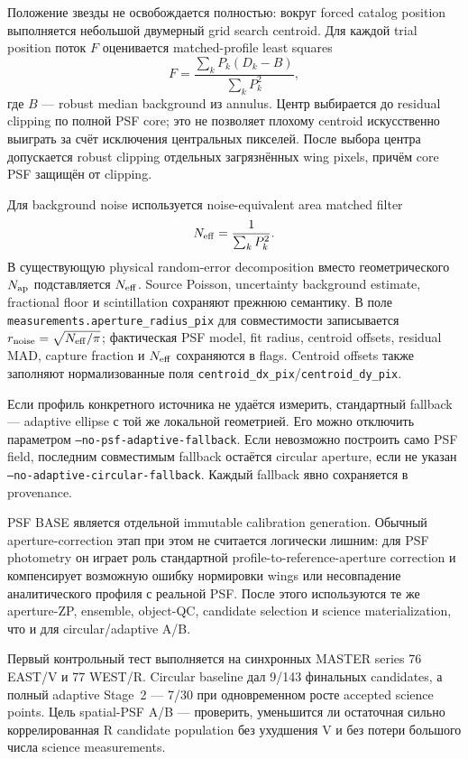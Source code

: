 Положение звезды не освобождается полностью: вокруг forced catalog position выполняется небольшой
двумерный grid search centroid. Для каждой trial position поток $F$ оценивается matched-profile
least squares
\begin{equation}
 F=\frac{\sum_k P_k(D_k-B)}{\sum_k P_k^2},
\end{equation}
где $B$ --- robust median background из annulus. Центр выбирается до residual clipping по полной
PSF core; это не позволяет плохому centroid искусственно выиграть за счёт исключения центральных
пикселей. После выбора центра допускается robust clipping отдельных загрязнённых wing pixels,
причём core PSF защищён от clipping.

Для background noise используется noise-equivalent area matched filter
\begin{equation}
 N_{\rm eff}=\frac{1}{\sum_k P_k^2}.
\end{equation}
В существующую physical random-error decomposition вместо геометрического $N_{\rm ap}$
подставляется $N_{\rm eff}$. Source Poisson, uncertainty background estimate, fractional floor и
scintillation сохраняют прежнюю семантику. В поле
\texttt{measurements.aperture\_radius\_pix} для совместимости записывается
$r_{\rm noise}=\sqrt{N_{\rm eff}/\pi}$; фактическая PSF model, fit radius, centroid offsets,
residual MAD, capture fraction и $N_{\rm eff}$ сохраняются в flags. Centroid offsets также
заполняют нормализованные поля \texttt{centroid\_dx\_pix}/\texttt{centroid\_dy\_pix}.

Если профиль конкретного источника не удаётся измерить, стандартный fallback ---
adaptive ellipse с той же локальной геометрией. Его можно отключить параметром
\texttt{--no-psf-adaptive-fallback}. Если невозможно построить само PSF field, последним
совместимым fallback остаётся circular aperture, если не указан
\texttt{--no-adaptive-circular-fallback}. Каждый fallback явно сохраняется в provenance.

PSF BASE является отдельной immutable calibration generation. Обычный aperture-correction этап
при этом не считается логически лишним: для PSF photometry он играет роль стандартной
profile-to-reference-aperture correction и компенсирует возможную ошибку нормировки wings или
несовпадение аналитического профиля с реальной PSF. После этого используются те же aperture-ZP,
ensemble, object-QC, candidate selection и science materialization, что и для circular/adaptive
A/B.

Первый контрольный тест выполняется на синхронных MASTER series 76 EAST/V и 77 WEST/R. Circular
baseline дал 9/143 финальных candidates, а полный adaptive Stage~2 --- 7/30 при одновременном
росте accepted science points. Цель spatial-PSF A/B --- проверить, уменьшится ли остаточная
сильно коррелированная R candidate population без ухудшения V и без потери большого числа
science measurements.

